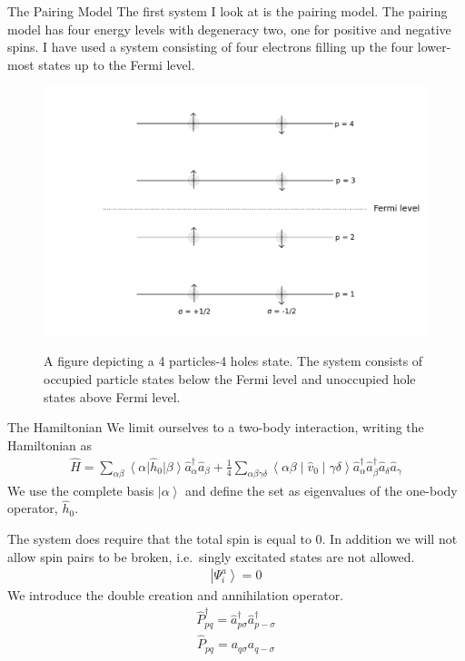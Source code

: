 \documentclass[twoside,english]{uiofysmaster}
\begin{document}
\begin{chapter}{The Pairing Model}
	The first system I look at is the pairing model. The pairing model has four energy levels with degeneracy two, one for positive and negative spins. I have 
	used a system consisting of four electrons filling up the four lower-most states up to the Fermi level. 
	\begin{figure}[h]
		\includegraphics[width=\textwidth]{Figures/Pairing_model.pdf}
		\label{PairingModel_1}
		\caption{A figure depicting a 4 particles-4 holes state. The system consists of occupied particle states below the Fermi level and unoccupied hole states above Fermi level.}
	\end{figure}
	
	\begin{section}{The Hamiltonian}
		We limit ourselves to a two-body interaction, writing the Hamiltonian as
		\begin{align}
			\hat H = \sum_{\alpha \beta} \left< \alpha \right| \hat h_0 \left| \beta \right> \hat a_{\alpha}^{\dagger} \hat a_{\beta} 
			        + \frac{1}{4} \sum_{\alpha \beta \gamma \delta} \left< \alpha \beta \middle| \hat v_0 \middle| \gamma \delta \right> \hat a_{\alpha}^{\dagger} \hat a_{\beta}^{\dagger} \hat a_{\delta} \hat a_{\gamma}
		\end{align}
		We use the complete basis $\left| \alpha \right>$ and define the set as eigenvalues of the one-body operator, $\hat h_0$. 
		
		The system does require that the total spin is equal to $0$. In addition we will not allow spin pairs to be broken, i.e.\  singly excitated states are not allowed. 
		\begin{align}
			\left| \Psi_i^a \right> = 0 
		\end{align}	
		We introduce the double creation and annihilation operator. 
		\begin{align}
			\hat P_{pq}^{\dagger} = \hat a_{p \sigma}^{\dagger} \hat a_{p -\sigma}^{\dagger}
		\end{align}
		\begin{align}
			\hat P_{pq} =  a_{q \sigma} a_{q -\sigma}
		\end{align}


\end{section}
\end{chapter}
\end{document}
